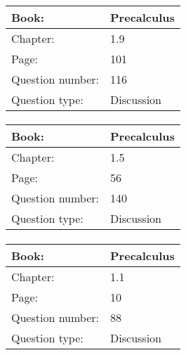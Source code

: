 \documentclass{article}
\begin{document}
            \paragraph{}
            \begin{tabularx}{1\textwidth}{
                    p{}
                    p{}
                }
                \toprule
                Book: & Precalculus
                \\
                \midrule
                Chapter: & 1.9
                \\
                \midrule
                Page: & 101
                \\
                \midrule
                Question number: & 116
                \\
                \midrule
                Question type: & Discussion
                \\
                \bottomrule
            \end{tabularx}
            
            \paragraph{}
            \begin{tabularx}{1\textwidth}{
                    p{}
                    p{}
                }
                \toprule
                Book: & Precalculus
                \\
                \midrule
                Chapter: & 1.5
                \\
                \midrule
                Page: & 56
                \\
                \midrule
                Question number: & 140
                \\
                \midrule
                Question type: & Discussion
                \\
                \bottomrule
            \end{tabularx}
            
            \paragraph{}
            \begin{tabularx}{1\textwidth}{
                    p{}
                    p{}
                }
                \toprule
                Book: & Precalculus
                \\
                \midrule
                Chapter: & 1.1
                \\
                \midrule
                Page: & 10
                \\
                \midrule
                Question number: & 88
                \\
                \midrule
                Question type: & Discussion
                \\
                \bottomrule
            \end{tabularx}
            
\end{document}
